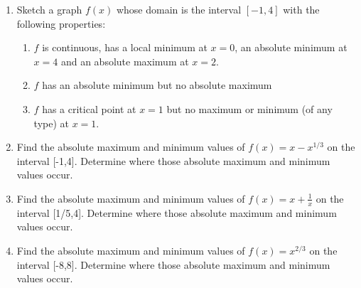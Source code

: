 \documentclass[11pt,fleqn]{article}
\def\ds{\displaystyle}
\begin{document}
\setlength{\parindent}{0cm}
\renewcommand{\headrulewidth}{0pt}
\newcommand{\blank}[1]{\rule{#1}{0.75pt}}
\renewcommand{\d}{\displaystyle}
\vspace*{-0.7in}
\begin{center}
 {\large{ }}
\end{center}

\begin{enumerate}
\item Sketch a graph $f(x)$ whose domain is the interval $[-1,4]$ with the following properties:
\begin{multicols}{3}
	\begin{enumerate}
	\item $f$ is continuous, has a local minimum at $x=0$, an absolute minimum at $x=4$ and an absolute maximum at $x=2.$
	\vfill
	\columnbreak
	\item $f$ has an absolute minimum but no absolute maximum
	\vfill
	\columnbreak
	\item $f$ has a critical point at $x=1$ but  no maximum or minimum (of any type) at $x=1.$
	\vfill
	 \end{enumerate}
\end{multicols}
\vspace{2in}
\item Find the absolute maximum and minimum values of $f(x)=x-x^{1/3}$ on the 
interval [-1,4].  Determine where those absolute maximum and minimum values occur.
\vspace{4in}
\newpage
\item  Find the absolute maximum and minimum values of $\ds f(x)=x+\frac{1}{x}$ on the 
interval [1/5,4].  Determine where those absolute maximum and minimum values occur.
\vfill
\item  Find the absolute maximum and minimum values of $\ds f(x)=x^{2/3}$ on the 
interval [-8,8].  Determine where those absolute maximum and minimum values occur.
\vfill
\end{enumerate}
\end{document}
